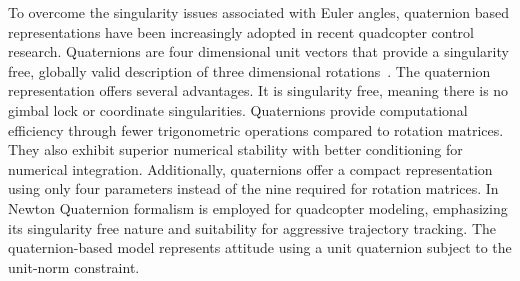 




To overcome the singularity issues associated with Euler angles, quaternion based representations have been increasingly adopted in recent quadcopter control research. Quaternions are four dimensional unit vectors that provide a singularity free, globally valid description of three dimensional rotations~\cite{roy2024design,nguyen2021adaptive}. The quaternion representation offers several advantages. It is singularity free, meaning there is no gimbal lock or coordinate singularities. Quaternions provide computational efficiency through fewer trigonometric operations compared to rotation matrices. They also exhibit superior numerical stability with better conditioning for numerical integration. Additionally, quaternions offer a compact representation using only four parameters instead of the nine required for rotation matrices. In  ~\cite{abera2024improved} Newton Quaternion formalism is employed  for quadcopter modeling, emphasizing its singularity free nature and suitability for aggressive trajectory tracking. The quaternion-based model represents attitude using a unit quaternion subject to the unit-norm constraint.

